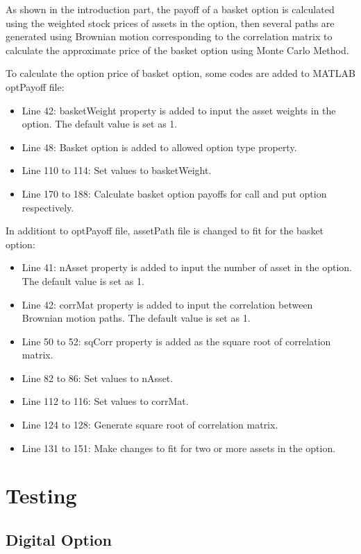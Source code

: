 \documentclass[]{elsarticle}
\theoremstyle{definition}
\theoremstyle{remark}
\begin{document}
As shown in the introduction part, the payoff of a basket option is calculated using the weighted stock prices of assets in the option, then several paths are generated using Brownian motion corresponding to the correlation matrix to calculate the approximate price of the basket option using Monte Carlo Method.

To calculate the option price of basket option, some codes are added to MATLAB optPayoff file:
\begin{itemize}
\item Line 42: basketWeight property is added to input the asset weights in the option. The default value is set as 1.
\item Line 48: Basket option is added to allowed option type property.
\item Line 110 to 114: Set values to basketWeight.
\item Line 170 to 188: Calculate basket option payoffs for call and put option respectively.
\end{itemize}

In additiont to optPayoff file, assetPath file is changed to fit for the basket option:
\begin{itemize}
\item Line 41: nAsset property is added to input the number of asset in the option. The default value is set as 1.
\item Line 42: corrMat property is added to input the correlation between Brownian motion paths. The default value is set as 1.
\item Line 50 to 52: sqCorr property is added as the square root of correlation matrix.
\item Line 82 to 86: Set values to nAsset.
\item Line 112 to 116: Set values to corrMat.
\item Line 124 to 128: Generate square root of correlation matrix.
\item Line 131 to 151: Make changes to fit for two or more assets in the option.
\end{itemize}

\section{Testing}
\subsection{Digital Option}
\end{document}
